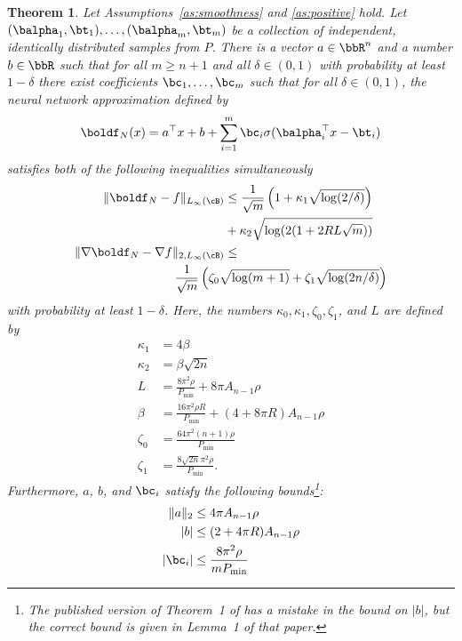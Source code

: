 \documentclass[letterpaper, 10 pt, conference]{ieeeconf}  %
\newtheorem{theorem}{Theorem}
\begin{document}
\begin{theorem}
  \label{thm:main}
  {\it
  Let Assumptions~\ref{as:smoothness} and \ref{as:positive} hold. Let 
  $(\balpha_1,\bt_1),\ldots,(\balpha_m,\bt_m)$ be a collection of independent, identically distributed samples from $P$.
  There is a vector $a\in\bbR^n$ and a number $b\in \bbR$ such that for all $m\ge n+1$ and all $\delta \in (0,1)$ with probability at least $1-\delta$
  there exist
  coefficients $\bc_1,\ldots,\bc_m$ such that for all $\delta \in (0,1)$, the neural network approximation defined by
  \begin{align*}
    \boldf_N(x)=a^\top x +b + \sum_{i=1}^m\bc_i \sigma(\balpha_i^\top x-\bt_i)
  \end{align*}
  satisfies both of the following inequalities simultaneously
  \begin{subequations}
    \begin{align}
      \nonumber
    \|\boldf_N-f\|_{L_{\infty}(\cB)}&\le \frac{1}{\sqrt{m}}\left(1+\kappa_1 \sqrt{\log(2/\delta)} \right)\\
    \label{eq:fApprox}
    &+\kappa_2 \sqrt{\log(2(1+2RL\sqrt{m}))} \\
    \nonumber
    \|\nabla \boldf_N-\nabla f\|_{2,L_{\infty}(\cB)}&\le\\
    \label{eq:gradApprox}
                                    &
                                      \hspace{-40pt}\frac{1}{\sqrt{m}}\left(\zeta_0\sqrt{\log(m+1)}+\zeta_1\sqrt{\log(2n/\delta)} \right)
  \end{align}
  \end{subequations}
  with probability at least $1-\delta$. Here, the numbers $\kappa_0,\kappa_1,\zeta_0,\zeta_1$, and $L$ are defined by
  \begin{align*}
      \kappa_1&=4\beta\\
      \kappa_2&=\beta\sqrt{2n}\\
      L&=\frac{8\pi^2 \rho}{P_{\min}}+8\pi A_{n-1} \rho\\
      \beta&= \frac{16\pi^2 \rho R}{P_{\min}}+(4+8\pi R)A_{n-1}\rho\\
    \zeta_0 &=\frac{64\pi^2 (n+1)\rho}{P_{\min}} \\
    \zeta_1 &= \frac{8\sqrt{2n} \pi^2 \rho}{P_{\min}}.
  \end{align*}
  Furthermore, $a$, $b$, and $\bc_i$ satisfy the following bounds\footnote{The published version of Theorem~1 of \cite{lamperski2024approximation} has a mistake in the bound on $|b|$, but the correct bound is given in Lemma~1 of that paper.}:
      \begin{align*}
      \|a\|_2 &\le 4\pi A_{n-1}\rho \\
      |b| & \le (2+4\pi R) A_{n-1}\rho \\
      |\bc_i| & \le \frac{8\pi^2 \rho}{m P_{\min}}
    \end{align*}
}
\end{theorem}
\end{document}
